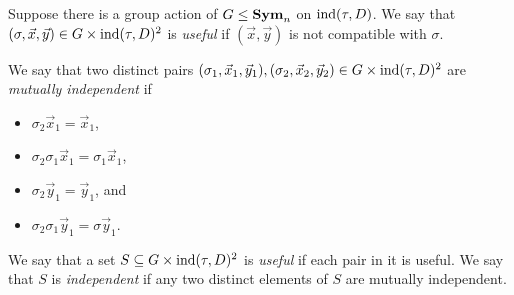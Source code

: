 \documentclass[../paper.tex]{subfiles}
\begin{document}
\begin{definition}
  Suppose there is a group action of $G \leq \text{\textbf{Sym}}_n$ on $\text{\upshape ind}(\tau, D)$. We
  say that $(\sigma, \vec{x}, \vec{y}) \in G \times \text{\upshape ind}(\tau, D)^{2}$ is
  \emph{useful} if $(\vec{x}, \vec{y})$ is not compatible with $\sigma$.

  We say that two distinct pairs $(\sigma_1, \vec{x}_1, \vec{y}_1), (\sigma_2,
  \vec{x}_2, \vec{y}_2) \in G\times \text{\upshape ind}(\tau, D)^2$ are \emph{mutually
    independent} if
  \begin{itemize}
    \setlength\itemsep{0mm}
  \item $\sigma_2 \vec{x}_1 = \vec{x}_1$,
  \item $\sigma_2 \sigma_1 \vec{x}_1 = \sigma_1 \vec{x}_1$,
  \item $\sigma_2 \vec{y}_1 = \vec{y}_1$, and
  \item $\sigma_2 \sigma_1 \vec{y}_1 = \sigma \vec{y}_1$.
  \end{itemize}
  
  We say that a set $S \subseteq G \times \text{\upshape ind}(\tau, D)^2$ is \emph{useful}
  if each pair in it is useful. We say that $S$ is \emph{independent} if any two
  distinct elements of $S$ are mutually independent.
\end{definition}


  
\end{document}
